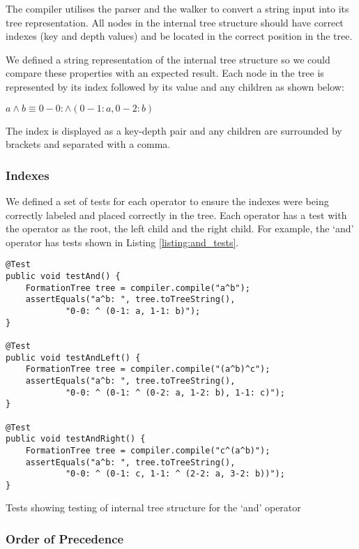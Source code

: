 \documentclass{report}
\begin{document}
The compiler utilises the parser and the walker to convert a string input into its tree representation. All nodes in the internal tree structure should have correct indexes (key and depth values) and be located in the correct position in the tree.

We defined a string representation of the internal tree structure so we could compare these properties with an expected result. Each node in the tree is represented by its index followed by its value and any children as shown below:

\begin{center}
$a\land b \equiv 0-0: \land (0-1: a, 0-2: b)$
\end{center}

The index is displayed as a key-depth pair and any children are surrounded by brackets and separated with a comma.

\subsubsection{Indexes}

We defined a set of tests for each operator to ensure the indexes were being correctly labeled and placed correctly in the tree. Each operator has a test with the operator as the root, the left child and the right child. For example, the `and' operator has tests shown in Listing \ref{listing:and_tests}.

\begin{listing}[ht]
\begin{verbatim}
@Test
public void testAnd() {
    FormationTree tree = compiler.compile("a^b");
    assertEquals("a^b: ", tree.toTreeString(), 
            "0-0: ^ (0-1: a, 1-1: b)");
}

@Test
public void testAndLeft() {
    FormationTree tree = compiler.compile("(a^b)^c");
    assertEquals("a^b: ", tree.toTreeString(), 
            "0-0: ^ (0-1: ^ (0-2: a, 1-2: b), 1-1: c)");
}

@Test
public void testAndRight() {
    FormationTree tree = compiler.compile("c^(a^b)");
    assertEquals("a^b: ", tree.toTreeString(), 
            "0-0: ^ (0-1: c, 1-1: ^ (2-2: a, 3-2: b))");
}
\end{verbatim}
\caption{Tests showing testing of internal tree structure for the `and' operator}
\label{listing:and_tests}
\end{listing}

\subsubsection{Order of Precedence}
\end{document}
